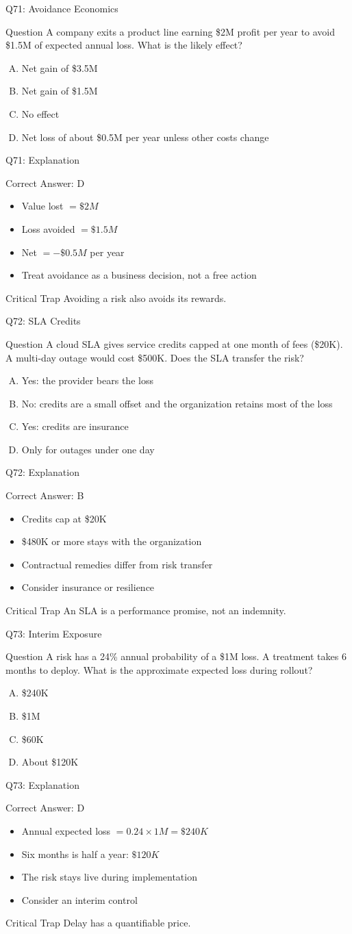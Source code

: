 \documentclass[aspectratio=169]{beamer}
\newcommand{\hq}[7]{%
  \begin{frame}{Q#1: #2}
    \begin{block}{Question}
      #3
    \end{block}
    \begin{enumerate}[(A)]
      #4
    \end{enumerate}
  \end{frame}
  \begin{frame}{Q#1: Explanation}
    \begin{block}{Correct Answer: #5}
      \begin{itemize}
        #6
      \end{itemize}
    \end{block}
    \begin{alertblock}{Critical Trap}
      #7
    \end{alertblock}
  \end{frame}
}
\begin{document}
\hq{71}{Avoidance Economics}
{A company exits a product line earning \$2M profit per year to avoid \$1.5M of expected annual loss. What is the likely effect?}
{\item Net gain of \$3.5M
 \item Net gain of \$1.5M
 \item No effect
 \item Net loss of about \$0.5M per year unless other costs change}
{D}
{\item Value lost $= \$2M$
 \item Loss avoided $= \$1.5M$
 \item Net $= -\$0.5M$ per year
 \item Treat avoidance as a business decision, not a free action}
{Avoiding a risk also avoids its rewards.}

\hq{72}{SLA Credits}
{A cloud SLA gives service credits capped at one month of fees (\$20K). A multi-day outage would cost \$500K. Does the SLA transfer the risk?}
{\item Yes: the provider bears the loss
 \item No: credits are a small offset and the organization retains most of the loss
 \item Yes: credits are insurance
 \item Only for outages under one day}
{B}
{\item Credits cap at \$20K
 \item \$480K or more stays with the organization
 \item Contractual remedies differ from risk transfer
 \item Consider insurance or resilience}
{An SLA is a performance promise, not an indemnity.}

\hq{73}{Interim Exposure}
{A risk has a 24\% annual probability of a \$1M loss. A treatment takes 6 months to deploy. What is the approximate expected loss during rollout?}
{\item \$240K
 \item \$1M
 \item \$60K
 \item About \$120K}
{D}
{\item Annual expected loss $= 0.24 \times 1M = \$240K$
 \item Six months is half a year: $\$120K$
 \item The risk stays live during implementation
 \item Consider an interim control}
{Delay has a quantifiable price.}
\end{document}
